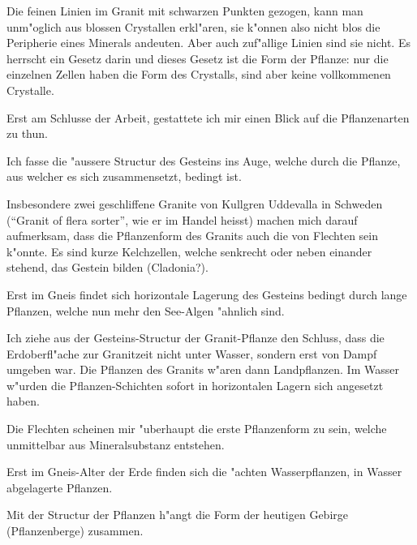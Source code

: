 \documentclass[a4paper, 11pt, oneside, german]{article}
\begin{document}
Die feinen Linien im Granit mit schwarzen Punkten gezogen, kann man unm"oglich aus blossen Crystallen erkl"aren, sie k"onnen also nicht blos die Peripherie eines Minerals andeuten. Aber auch zuf"allige Linien sind sie nicht. Es herrscht ein Gesetz darin und dieses Gesetz ist die Form der Pflanze: nur die einzelnen Zellen haben die Form des Crystalls, sind aber keine vollkommenen Crystalle.

Erst am Schlusse der Arbeit, gestattete ich mir einen Blick auf die Pflanzenarten zu thun.

Ich fasse die "aussere Structur des Gesteins ins Auge, welche durch die Pflanze, aus welcher es sich zusammensetzt, bedingt ist.

Insbesondere zwei geschliffene Granite von Kullgren Uddevalla in Schweden ("`Granit of flera sorter"', wie er im Handel heisst) machen mich darauf aufmerksam, dass die Pflanzenform des Granits auch die von Flechten sein k"onnte. Es sind kurze Kelchzellen, welche senkrecht oder neben einander stehend, das Gestein bilden (Cladonia?).

Erst im Gneis findet sich horizontale Lagerung des Gesteins bedingt durch lange Pflanzen, welche nun mehr den See-Algen "ahnlich sind.

Ich ziehe aus der Gesteins-Structur der Granit-Pflanze den Schluss, dass die Erdoberfl"ache zur Granitzeit nicht unter Wasser, sondern erst von Dampf umgeben war. Die Pflanzen des Granits w"aren dann Landpflanzen. Im Wasser w"urden die Pflanzen-Schichten sofort in horizontalen Lagern sich angesetzt haben.

Die Flechten scheinen mir "uberhaupt die erste Pflanzenform zu sein, welche unmittelbar aus Mineralsubstanz entstehen.

Erst im Gneis-Alter der Erde finden sich die "achten Wasserpflanzen, in Wasser abgelagerte Pflanzen.

Mit der Structur der Pflanzen h"angt die Form der heutigen Gebirge (Pflanzenberge) zusammen.
\end{document}
